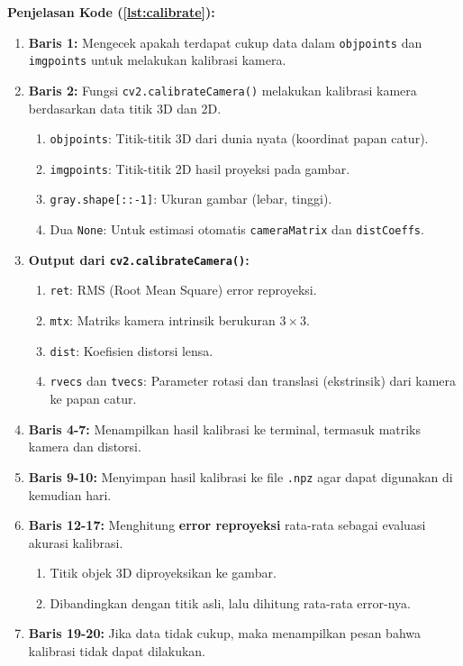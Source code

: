 \documentclass[12pt,a4paper]{article}
\begin{document}
\textbf{Penjelasan Kode (\ref{lst:calibrate}):}
\begin{enumerate}[label={},itemsep=0cm]
    \item \textbf{Baris 1:} Mengecek apakah terdapat cukup data dalam \texttt{objpoints} dan \texttt{imgpoints} untuk melakukan kalibrasi kamera.
    
    \item \textbf{Baris 2:} Fungsi \texttt{cv2.calibrateCamera()} melakukan kalibrasi kamera berdasarkan data titik 3D dan 2D.
    \begin{enumerate}[label=\alph*.]
        \item \texttt{objpoints}: Titik-titik 3D dari dunia nyata (koordinat papan catur).
        \item \texttt{imgpoints}: Titik-titik 2D hasil proyeksi pada gambar.
        \item \texttt{gray.shape[::-1]}: Ukuran gambar (lebar, tinggi).
        \item Dua \texttt{None}: Untuk estimasi otomatis \texttt{cameraMatrix} dan \texttt{distCoeffs}.
    \end{enumerate}

    \item \textbf{Output dari \texttt{cv2.calibrateCamera()}:}
    \begin{enumerate}[label=\alph*.]
        \item \texttt{ret}: RMS (Root Mean Square) error reproyeksi.
        \item \texttt{mtx}: Matriks kamera intrinsik berukuran $3 \times 3$.
        \item \texttt{dist}: Koefisien distorsi lensa.
        \item \texttt{rvecs} dan \texttt{tvecs}: Parameter rotasi dan translasi (ekstrinsik) dari kamera ke papan catur.
    \end{enumerate}

    \item \textbf{Baris 4-7:} Menampilkan hasil kalibrasi ke terminal, termasuk matriks kamera dan distorsi.

    \item \textbf{Baris 9-10:} Menyimpan hasil kalibrasi ke file \texttt{.npz} agar dapat digunakan di kemudian hari.

    \item \textbf{Baris 12-17:} Menghitung \textbf{error reproyeksi} rata-rata sebagai evaluasi akurasi kalibrasi.
    \begin{enumerate}[label=\alph*.]
        \item Titik objek 3D diproyeksikan ke gambar.
        \item Dibandingkan dengan titik asli, lalu dihitung rata-rata error-nya.
    \end{enumerate}

    \item \textbf{Baris 19-20:} Jika data tidak cukup, maka menampilkan pesan bahwa kalibrasi tidak dapat dilakukan.
\end{enumerate}
\end{document}
